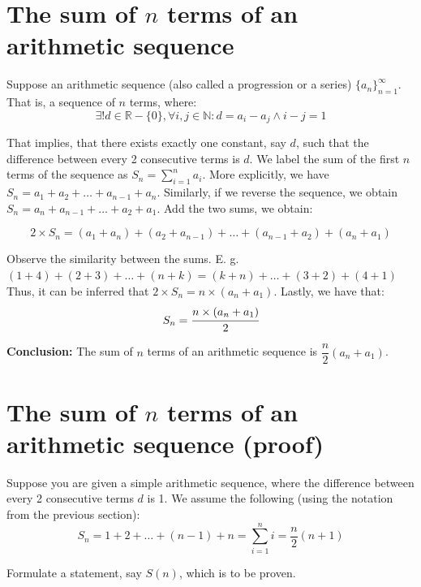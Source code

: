\documentclass[10pt,a4paper]{article}
\begin{document}

\newpage

\section*{The sum of $n$ terms of an arithmetic sequence}

Suppose an arithmetic sequence (also called a progression or a series) $\{a_{n}\}_{n=1}^{\infty}$. That is, a sequence of $n$ terms, where:
$$\exists! d \in \mathbb{R} - \{0\}, \forall i,j \in \mathbb{N}: d = a_{i} - a_{j} \land i - j = 1$$ 

That implies, that there exists exactly one constant, say $d$, such that the difference between every 2
consecutive terms is $d$. We label the sum of the first $n$ terms of the sequence as $S_{n}=\sum_{i=1}^n a_{i}$.
More explicitly, we have $S_{n} = a_{1} + a_{2} + \dots + a_{n-1} + a_{n}$. Similarly, if we reverse the 
sequence, we obtain $S_{n} = a_{n} + a_{n-1} + \dots + a_{2} + a_{1}$. Add the two sums, we obtain:

$$2 \times S_{n} = (a_{1} + a_{n}) + (a_{2} + a_{n-1}) + \dots + (a_{n-1} + a_{2}) + (a_{n} + a_{1})$$

Observe the similarity between the sums. E. g.
$(1 + 4) + (2 + 3) + \dots + (n + k) = (k + n) + \dots + (3 + 2) + (4 + 1)$
Thus, it can be inferred that $2 \times S_{n} = n \times (a_{n} + a_{1})$.
Lastly, we have that: $$S_{n} = \cfrac{n \times (a_{n} + a_{1})}{2}$$

\textbf{Conclusion:} The sum of $n$ terms of an arithmetic sequence is $\dfrac{n}{2} (a_{n} + a_{1})$.



\section*{The sum of $n$ terms of an arithmetic sequence (proof)}

Suppose you are given a simple arithmetic sequence, where the difference between every 2 consecutive terms 
$d$ is 1. We assume the following (using the notation from the previous section): 
$$S_{n} = 1 + 2 + \dots + (n - 1) + n = \sum_{i=1}^{n} i = \frac{n}{2} (n + 1)$$

Formulate a statement, say $S(n)$, which is to be proven.
\end{document}
